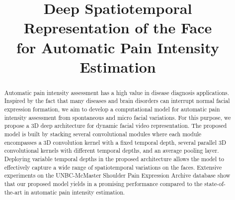 \documentclass[a4paper,conference]{IEEEtran}
\begin{document}
%
\title{Deep Spatiotemporal Representation of the Face \\ for Automatic Pain Intensity Estimation}


\author{
}



\maketitle

\begin{abstract}
Automatic pain intensity assessment has a high value in disease diagnosis applications. Inspired by the fact that many diseases and brain disorders can interrupt normal facial expression formation, we aim to develop a computational model for automatic pain intensity assessment from spontaneous and micro facial variations. For this purpose, we propose a 3D deep architecture for dynamic facial video representation. The proposed model is built by stacking several convolutional modules where each module encompasses a 3D convolution kernel with a fixed temporal depth, several parallel 3D convolutional kernels with different temporal depths, and an average pooling layer. Deploying variable temporal depths in the proposed architecture allows the model to effectively capture a wide range of spatiotemporal variations on the faces. Extensive experiments on the UNBC-McMaster Shoulder Pain Expression Archive database show that our proposed model yields in a promising performance compared to the state-of-the-art in automatic pain intensity estimation. 
\end{abstract}

\end{document}

